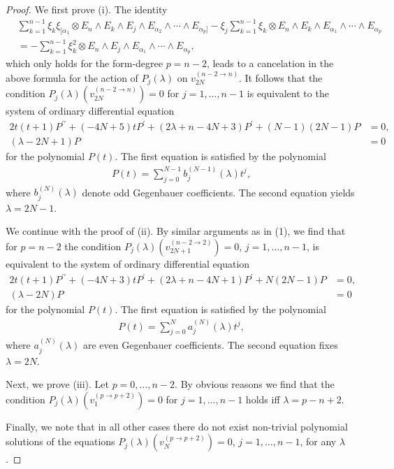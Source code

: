 \documentclass[a4paper,12pt,reqno]{amsart}
\numberwithin{theorem}{subsection}
\numberwithin{equation}{section}
\begin{document}
\begin{proof} We first prove (i). The identity
\begin{align*}
   & \sum_{k=1}^{n-1} \xi_{k}\xi_{[\alpha_1}
   \otimes E_n\wedge E_k \wedge E_j\wedge  E_{\alpha_2}\wedge\cdots\wedge E_{\alpha_{p}]}
   -\xi_j \sum_{k=1}^{n-1}\xi_{k} \otimes E_n\wedge E_k\wedge E_{\alpha_1}\wedge\cdots\wedge E_{\alpha_{p}}\\
   &=-\sum_{k=1}^{n-1}\xi_k^2\otimes E_n\wedge E_j\wedge E_{\alpha_1}\wedge\cdots\wedge E_{\alpha_p},
\end{align*}
which only holds for the form-degree $p=n-2$, leads to a cancelation in the
above formula for the action of $P_j(\lambda)$ on $v_{2N}^{(n-2\to n)}$. It
follows that the condition $P_j(\lambda)(v_{2N}^{(n-2\to  n)})=0$ for
$j=1,\ldots,n-1$ is equivalent to the system of ordinary differential equation
\begin{align*}
      2t(t\!+\!1)P^{\prime\prime} + (-4N\!+\!5)tP^\prime + (2\lambda\!+\!n\!-\!4N\!+\!3) P^\prime +
      (N\!-\!1)(2N\!-\!1)P & = 0,\\
      (\lambda\!-\!2N\!+\!1)P & = 0
\end{align*}
for the polynomial $P(t)$. The first equation is satisfied by the polynomial
\begin{align*}
      P(t)=\sum_{j=0}^{N-1}b_j^{(N-1)}(\lambda) t^j,
\end{align*}
where $b_j^{(N)}(\lambda)$ denote odd Gegenbauer coefficients. The second
equation yields $\lambda=2N-1$.

We continue with the proof of (ii). By similar arguments as in (1), we find
that for $p=n-2$ the condition $P_j(\lambda)(v_{2N+1}^{(n-2\to 2)})=0$,
$j=1,\ldots,n-1$, is equivalent to the system of ordinary differential equation
\begin{align*}
      2t(t\!+\!1)P^{\prime\prime} + (-4N\!+\!3)t P^\prime + (2\lambda\!+\!n\!-\!4N\!+\!1) P^\prime
      + N(2N\!-\!1)P & = 0,\\
      (\lambda\!-\!2N)P & = 0
\end{align*}
for the polynomial $P(t)$. The first equation is satisfied by the polynomial
\begin{align*}
      P(t)=\sum_{j=0}^{N}a_j^{(N)}(\lambda) t^j,
\end{align*}
where $a_j^{(N)}(\lambda)$ are even Gegenbauer coefficients. The second
equation fixes $\lambda=2N$.

Next, we prove (iii). Let $p=0,\ldots,n-2$. By obvious reasons we find that the
condition $P_j(\lambda)(v_{1}^{(p\to p+2)})=0$ for $j=1,\ldots,n-1$ holds iff
$\lambda=p-n+2$.

Finally, we note that in all other cases there do not exist non-trivial
polynomial solutions of the equations $P_j(\lambda)(v_N^{(p\to p+2)})=0$,
$j=1,\ldots,n-1$, for any $\lambda$.
\end{proof}
\end{document}

